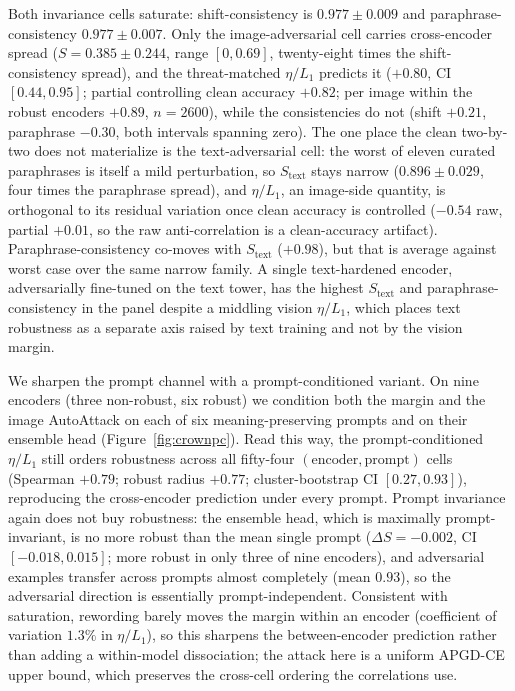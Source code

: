 \documentclass{article}
\theoremstyle{definition}
\begin{document}
Both invariance cells saturate: shift-consistency is $0.977\pm0.009$ and paraphrase-consistency
$0.977\pm0.007$. Only the image-adversarial cell carries cross-encoder spread ($S=0.385\pm0.244$, range
$[0,0.69]$, twenty-eight times the shift-consistency spread), and the threat-matched $\eta/L_1$ predicts
it ($+0.80$, CI $[0.44,0.95]$; partial controlling clean accuracy $+0.82$; per image within the robust
encoders $+0.89$, $n{=}2600$), while the consistencies do not (shift $+0.21$, paraphrase $-0.30$, both
intervals spanning zero). The one place the clean two-by-two does not materialize is the text-adversarial
cell: the worst of eleven curated paraphrases is itself a mild perturbation, so $S_{\text{text}}$ stays
narrow ($0.896\pm0.029$, four times the paraphrase spread), and $\eta/L_1$, an image-side quantity, is
orthogonal to its residual variation once clean accuracy is controlled ($-0.54$ raw, partial $+0.01$, so
the raw anti-correlation is a clean-accuracy artifact). Paraphrase-consistency co-moves with
$S_{\text{text}}$ ($+0.98$), but that is average against worst case over the same narrow family. A single
text-hardened encoder, adversarially fine-tuned on the text tower, has the highest $S_{\text{text}}$ and
paraphrase-consistency in the panel despite a middling vision $\eta/L_1$, which places text robustness as
a separate axis raised by text training and not by the vision margin.

We sharpen the prompt channel with a prompt-conditioned variant. On nine encoders (three non-robust,
six robust) we condition both the margin and the image AutoAttack on each of six meaning-preserving
prompts and on their ensemble head (Figure~\ref{fig:crownpc}). Read this way, the prompt-conditioned
$\eta/L_1$ still orders robustness across all fifty-four $(\text{encoder},\text{prompt})$ cells
(Spearman $+0.79$; robust radius $+0.77$; cluster-bootstrap CI $[0.27,0.93]$), reproducing the
cross-encoder prediction under every prompt. Prompt invariance again does not buy robustness: the
ensemble head, which is maximally prompt-invariant, is no more robust than the mean single prompt
($\Delta S=-0.002$, CI $[-0.018,0.015]$; more robust in only three of nine encoders), and adversarial
examples transfer across prompts almost completely (mean $0.93$), so the adversarial direction is
essentially prompt-independent. Consistent with saturation, rewording barely moves the margin within an
encoder (coefficient of variation $1.3\%$ in $\eta/L_1$), so this sharpens the between-encoder
prediction rather than adding a within-model dissociation; the attack here is a uniform APGD-CE upper
bound, which preserves the cross-cell ordering the correlations use.
\end{document}
